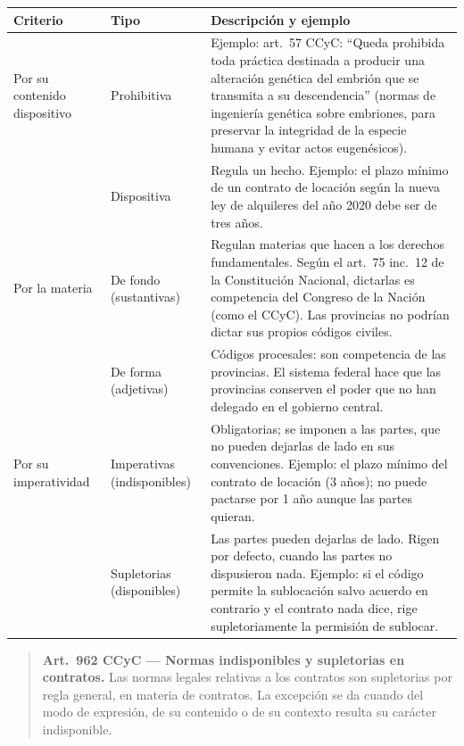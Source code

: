 \documentclass[12pt,oneside]{book}
\begin{document}
\begin{table}[H]
\centering
\begin{tabularx}{\textwidth}{>{\raggedright\arraybackslash}p{} >{\raggedright\arraybackslash}p{} >{\raggedright\arraybackslash}X}
\toprule
\textbf{Criterio} & \textbf{Tipo} & \textbf{Descripción y ejemplo} \\
\midrule
Por su contenido dispositivo & Prohibitiva &
Ejemplo: art.~57 CCyC: ``Queda prohibida toda práctica destinada a producir una alteración genética del embrión que se transmita a su descendencia'' (normas de ingeniería genética sobre embriones, para preservar la integridad de la especie humana y evitar actos eugenésicos). \\
\addlinespace
& Dispositiva &
Regula un hecho. Ejemplo: el plazo mínimo de un contrato de locación según la nueva ley de alquileres del año 2020 debe ser de tres años. \\
\midrule
Por la materia & De fondo (sustantivas) &
Regulan materias que hacen a los derechos fundamentales. Según el art.~75 inc.~12 de la Constitución Nacional, dictarlas es competencia del Congreso de la Nación (como el CCyC). Las provincias no podrían dictar sus propios códigos civiles. \\
\addlinespace
& De forma (adjetivas) &
Códigos procesales: son competencia de las provincias. El sistema federal hace que las provincias conserven el poder que no han delegado en el gobierno central. \\
\midrule
Por su imperatividad & Imperativas (indisponibles) &
Obligatorias; se imponen a las partes, que no pueden dejarlas de lado en sus convenciones. Ejemplo: el plazo mínimo del contrato de locación (3 años); no puede pactarse por 1 año aunque las partes quieran. \\
\addlinespace
& Supletorias (disponibles) &
Las partes pueden dejarlas de lado. Rigen por defecto, cuando las partes no dispusieron nada. Ejemplo: si el código permite la sublocación salvo acuerdo en contrario y el contrato nada dice, rige supletoriamente la permisión de sublocar. \\
\bottomrule
\end{tabularx}
\end{table}

\begin{quote}
\textbf{Art.~962 CCyC --- Normas indisponibles y supletorias en contratos.} Las normas legales relativas a los contratos son supletorias por regla general, en materia de contratos. La excepción se da cuando del modo de expresión, de su contenido o de su contexto resulta su carácter indisponible.
\end{quote}
\end{document}
